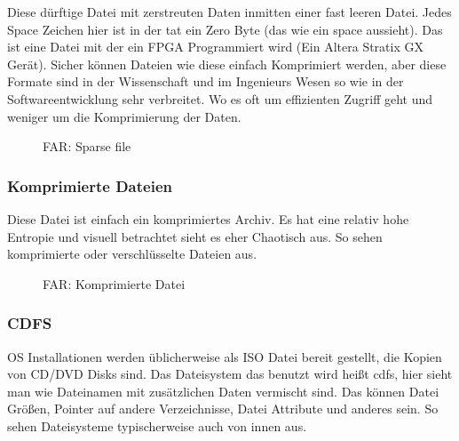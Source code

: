 Diese d\"urftige Datei mit zerstreuten Daten inmitten einer fast leeren Datei.
Jedes Space Zeichen hier ist in der tat ein Zero Byte (das wie ein space aussieht). %
Das ist eine Datei mit der ein FPGA Programmiert wird (Ein Altera Stratix GX Ger\"at).
Sicher k\"onnen Dateien wie diese einfach Komprimiert werden, aber diese Formate sind in 
der Wissenschaft und im Ingenieurs Wesen so wie in der Softwareentwicklung sehr verbreitet.
Wo es oft um effizienten Zugriff geht und weniger um die Komprimierung der Daten.


\begin{figure}[H]
\centering
{}
\caption{FAR: Sparse file}
\end{figure}

\clearpage
\subsubsection{Komprimierte Dateien}

Diese Datei ist einfach ein komprimiertes Archiv. 
Es hat eine relativ hohe Entropie und visuell betrachtet sieht es 
eher Chaotisch aus. So sehen komprimierte oder verschl\"usselte Dateien aus.

\begin{figure}[H]
\centering
{}
\caption{FAR: Komprimierte Datei}
\end{figure}

\clearpage
\subsubsection{\ac{CDFS}}

\ac{OS} Installationen werden \"ublicherweise als ISO Datei bereit gestellt, die Kopien von CD/DVD Disks sind. 
Das Dateisystem das benutzt wird heißt \ac{cdfs}, hier sieht man wie Dateinamen mit zus\"atzlichen Daten vermischt sind.
Das k\"onnen Datei Gr\"oßen, Pointer auf andere Verzeichnisse, Datei Attribute und anderes sein. 
So sehen Dateisysteme typischerweise auch von innen aus.

